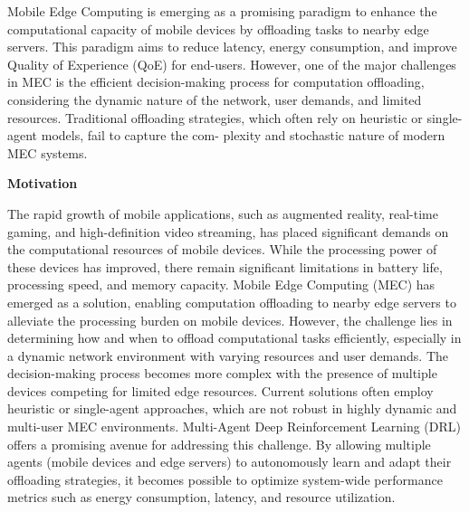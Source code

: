 \documentclass[12pt]{article}
\begin{document}
Mobile Edge Computing is emerging as a promising paradigm to enhance the computational capacity of mobile devices by offloading tasks to nearby edge servers. This paradigm aims to reduce latency, energy consumption, and improve Quality of Experience (QoE) for end-users. However, one of the major challenges in MEC is the efficient decision-making process for computation offloading, considering the dynamic nature of the network, user demands, and limited resources. Traditional offloading strategies, which often rely on heuristic or single-agent models, fail to capture the com- plexity and stochastic nature of modern MEC systems. 


	
\vspace{8mm}

\noindent\textbf{\large Motivation}

\vspace{1.5mm}

The rapid growth of mobile applications, such as augmented reality, real-time gaming, and high-definition video streaming, has placed significant demands on the computational resources of mobile devices. While the processing power of these devices has improved, there remain significant limitations in battery life, processing speed, and memory capacity. Mobile Edge Computing (MEC) has emerged as a solution, enabling computation offloading to nearby edge servers to alleviate the processing burden on mobile devices. However, the challenge lies in determining how and when to offload computational tasks efficiently, especially in a dynamic network environment with varying resources and user demands. The decision-making process becomes more complex with the presence of multiple devices competing for limited edge resources. Current solutions often employ heuristic or single-agent approaches, which are not robust in highly dynamic and multi-user MEC environments. Multi-Agent Deep Reinforcement Learning (DRL) offers a promising avenue for addressing this challenge. By allowing multiple agents (mobile devices and edge servers) to autonomously learn and adapt their offloading strategies, it becomes possible to optimize system-wide performance metrics such as energy consumption, latency, and resource utilization. 

\newpage
\end{document}
